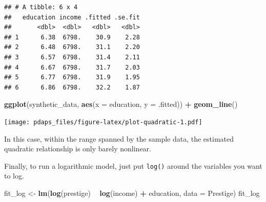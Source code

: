 \documentclass[12pt,oneside,openany]{book}
\newenvironment{Shaded}{\begin{snugshade}}{\end{snugshade}}
\newcommand{\KeywordTok}[1]{\textcolor[rgb]{0.13,0.29,0.53}{\textbf{#1}}}
\newcommand{\DataTypeTok}[1]{\textcolor[rgb]{0.13,0.29,0.53}{#1}}
\newcommand{\DecValTok}[1]{\textcolor[rgb]{0.00,0.00,0.81}{#1}}
\newcommand{\StringTok}[1]{\textcolor[rgb]{0.31,0.60,0.02}{#1}}
\newcommand{\OperatorTok}[1]{\textcolor[rgb]{0.81,0.36,0.00}{\textbf{#1}}}
\newcommand{\NormalTok}[1]{#1}
\begin{document}
\begin{Shaded}
\end{Shaded}

\begin{verbatim}
## # A tibble: 6 x 4
##   education income .fitted .se.fit
##       <dbl>  <dbl>   <dbl>   <dbl>
## 1      6.38  6798.    30.9    2.28
## 2      6.48  6798.    31.1    2.20
## 3      6.57  6798.    31.4    2.11
## 4      6.67  6798.    31.7    2.03
## 5      6.77  6798.    31.9    1.95
## 6      6.86  6798.    32.2    1.87
\end{verbatim}

\begin{Shaded}
\begin{Highlighting}[]
\KeywordTok{ggplot}\NormalTok{(synthetic_data, }\KeywordTok{aes}\NormalTok{(}\DataTypeTok{x =}\NormalTok{ education, }\DataTypeTok{y =}\NormalTok{ .fitted)) }\OperatorTok{+}
\StringTok{    }\KeywordTok{geom_line}\NormalTok{()}
\end{Highlighting}
\end{Shaded}

\texttt{[image: pdaps\_files/figure-latex/plot-quadratic-1.pdf]}

In this case, within the range spanned by the sample data, the estimated
quadratic relationship is only barely nonlinear.

Finally, to run a logarithmic model, just put \texttt{log()} around the
variables you want to log.

\begin{Shaded}
\begin{Highlighting}[]
\NormalTok{fit_log <-}\StringTok{ }\KeywordTok{lm}\NormalTok{(}\KeywordTok{log}\NormalTok{(prestige) }\OperatorTok{~}\StringTok{ }\KeywordTok{log}\NormalTok{(income) }\OperatorTok{+}\StringTok{ }\NormalTok{education, }\DataTypeTok{data =}\NormalTok{ Prestige)}
\NormalTok{fit_log}
\end{Highlighting}
\end{Shaded}
\end{document}
